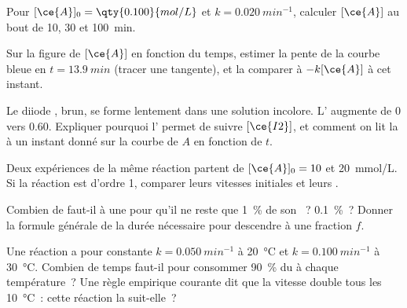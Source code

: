 \begin{exercise}[$\star\star$]\label{exo:g12:reaction-rates:8}
Pour $[\ce{A}]_0 = \qty{0.100}{mol/L}$ et $k = \qty{0.020}{min^{-1}}$,
calculer $[\ce{A}]$ au bout de 10, 30 et \qty{100}{min}.
\end{exercise}

\begin{exercise}[$\star\star$]\label{exo:g12:reaction-rates:9}
Sur la figure de $[\ce{A}]$ en fonction du temps, estimer la pente de la
courbe bleue en $t = \qty{13.9}{min}$ (tracer une tangente), et la
comparer à
$-k[\ce{A}]$ à cet instant.
\end{exercise}

\begin{exercise}[$\star\star$]\label{exo:g12:reaction-rates:10}
Le diiode , brun, se forme lentement dans une solution incolore.
L' augmente de 0 vers 0.60. Expliquer pourquoi l'
permet de suivre $[\ce{I2}]$, et comment on lit la 
à un instant donné sur la courbe de $A$ en fonction de $t$.
\end{exercise}

\begin{exercise}[$\star\star$]\label{exo:g12:reaction-rates:11}
Deux expériences de la même réaction partent de $[\ce{A}]_0 = 10$ et
\qty{20}{mmol/L}. Si la réaction est d'ordre 1, comparer leurs vitesses
initiales et leurs .
\end{exercise}

\begin{exercise}[$\star\star\star$]\label{exo:g12:reaction-rates:12}
Combien de  faut-il à une  pour
qu'il ne reste que \qty{1}{\percent} de son ~?
\qty{0.1}{\percent}~? Donner la formule générale de la durée nécessaire
pour descendre à une fraction $f$.
\end{exercise}

\begin{exercise}[$\star\star\star$]\label{exo:g12:reaction-rates:13}
Une réaction a pour constante $k = \qty{0.050}{min^{-1}}$ à
\qty{20}{\celsius} et
$k = \qty{0.100}{min^{-1}}$ à \qty{30}{\celsius}. Combien de temps
faut-il pour consommer \qty{90}{\percent} du  à chaque
température~? Une règle empirique courante dit que la vitesse double
tous les \qty{10}{\celsius}~: cette réaction la suit-elle~?
\end{exercise}

